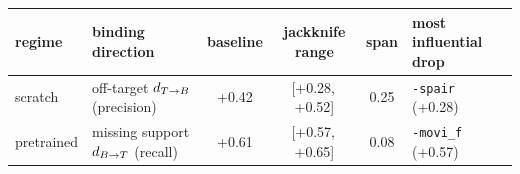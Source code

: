 \begin{tabular}{llcccl}
\toprule
regime & binding direction & baseline & jackknife range & span & most influential drop \\
\midrule
scratch & off-target $d_{T\to B}$ (precision) & +0.42 & [+0.28,\,+0.52] & 0.25 & \texttt{-spair} (+0.28) \\
pretrained & missing support $d_{B\to T}$ (recall) & +0.61 & [+0.57,\,+0.65] & 0.08 & \texttt{-movi\_f} (+0.57) \\
\bottomrule
\end{tabular}
